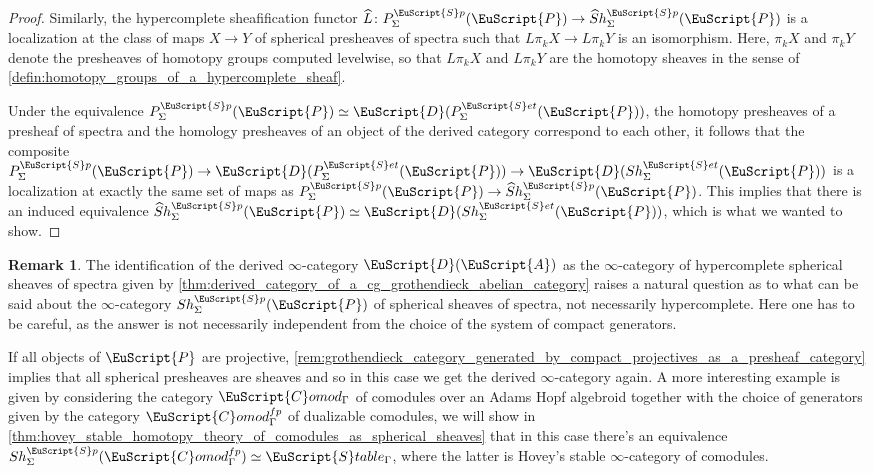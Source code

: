 \documentclass[oneside,a4paper]{amsart}
\newcommand{\euscr}[1]{\EuScript{#1}} %
\newcommand{\acat}{\euscr{A}} %
\newcommand{\dcat}{\euscr{D}} %
\newcommand{\pcat}{\euscr{P}} %
\newcommand{\spectra}{\euscr{S}p} %
\newcommand{\sets}{\euscr{S}et} %
\newcommand{\hpsheaves}{\widehat{S}h} %
\newcommand{\hpssheavesofspectra}{\hpsheaves_{\Sigma}^{\spectra}} %
\newcommand{\Comod}{\euscr{C}omod} %
\newcommand{\ComodGamma}{\Comod_{\Gamma}} %
\theoremstyle{plain}
\theoremstyle{definition}
\newtheorem{rem}[thm]{Remark}
\theoremstyle{remark}
\begin{document}
\begin{proof}
Similarly, the hypercomplete sheafification functor $\widehat{L} \colon P_{\Sigma}^{\spectra}(\pcat) \rightarrow \hpssheavesofspectra(\pcat)$ is a localization at the class of maps $X \rightarrow Y$ of spherical presheaves of spectra such that $L \pi_{k}X \rightarrow L \pi_{k}Y$ is an isomorphism. Here, $\pi_{k}X$ and $\pi_{k}Y$ denote the presheaves of homotopy groups computed levelwise, so that $L \pi_{k} X$ and $L \pi_{k} Y$ are the homotopy sheaves in the sense of \cref{defin:homotopy_groups_of_a_hypercomplete_sheaf}. 

Under the equivalence $P_{\Sigma}^{\spectra}(\pcat) \simeq \dcat(P_{\Sigma}^{\sets}(\pcat))$, the homotopy presheaves of a presheaf of spectra and the homology presheaves of an object of the derived category correspond to each other, it follows that the composite $P_{\Sigma}^{\spectra}(\pcat) \rightarrow \dcat(P_{\Sigma}^{\sets}(\pcat)) \rightarrow \dcat(Sh_{\Sigma}^{\sets}(\pcat))$ is a localization at exactly the same set of maps as $P_{\Sigma}^{\spectra}(\pcat) \rightarrow \hpssheavesofspectra(\pcat)$. This implies that there is an induced equivalence $\hpssheavesofspectra(\pcat) \simeq \dcat(Sh_{\Sigma}^{\sets}(\pcat))$, which is what we wanted to show. 
\end{proof}

\begin{rem}
The identification of the derived $\infty$-category $\dcat(\acat)$ as the $\infty$-category of hypercomplete spherical sheaves of spectra given by \cref{thm:derived_category_of_a_cg_grothendieck_abelian_category} raises a natural question as to what can be said about the $\infty$-category $Sh_{\Sigma}^{\spectra}(\pcat)$ of spherical sheaves of spectra, not necessarily hypercomplete. Here one has to be careful, as the answer is not necessarily independent from the choice of the system of compact generators. 

If all objects of $\pcat$ are projective, \cref{rem:grothendieck_category_generated_by_compact_projectives_as_a_presheaf_category} implies that all spherical presheaves are sheaves and so in this case we get the derived $\infty$-category again. A more interesting example is given by considering the category $\ComodGamma$ of comodules over an Adams Hopf algebroid together with the choice of generators given by the category $\ComodGamma^{fp}$ of dualizable comodules, we will show in \cref{thm:hovey_stable_homotopy_theory_of_comodules_as_spherical_sheaves} that in this case there's an equivalence $Sh_{\Sigma}^{\spectra}(\ComodGamma^{fp}) \simeq \euscr{S}table_{\Gamma}$, where the latter is Hovey's stable $\infty$-category of comodules. 
\end{rem}
\end{document}
